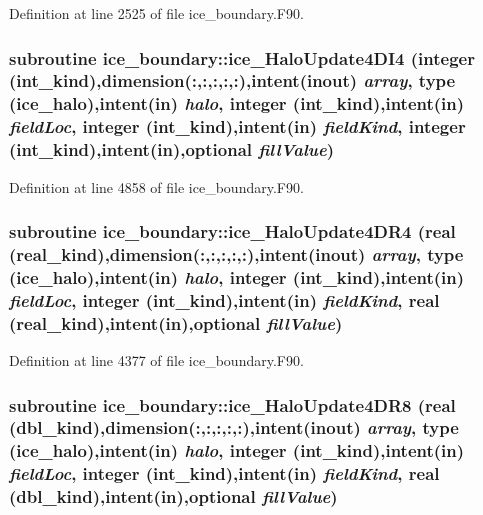 Definition at line 2525 of file ice\_\-boundary.F90.\hypertarget{namespaceice__boundary_aae151e9a894787fddeb6510b20919203}{
\subsubsection[{ice\_\-HaloUpdate4DI4}]{\setlength{\rightskip}{0pt plus 5cm}subroutine ice\_\-boundary::ice\_\-HaloUpdate4DI4 (integer (int\_\-kind),dimension(:,:,:,:,:),intent(inout) {\em array}, \/  type (ice\_\-halo),intent(in) {\em halo}, \/  integer (int\_\-kind),intent(in) {\em fieldLoc}, \/  integer (int\_\-kind),intent(in) {\em fieldKind}, \/  integer (int\_\-kind),intent(in),optional {\em fillValue})}}
\label{namespaceice__boundary_aae151e9a894787fddeb6510b20919203}


Definition at line 4858 of file ice\_\-boundary.F90.\hypertarget{namespaceice__boundary_a57e7b05282c54e5996798a87fa1a2e16}{
\subsubsection[{ice\_\-HaloUpdate4DR4}]{\setlength{\rightskip}{0pt plus 5cm}subroutine ice\_\-boundary::ice\_\-HaloUpdate4DR4 (real (real\_\-kind),dimension(:,:,:,:,:),intent(inout) {\em array}, \/  type (ice\_\-halo),intent(in) {\em halo}, \/  integer (int\_\-kind),intent(in) {\em fieldLoc}, \/  integer (int\_\-kind),intent(in) {\em fieldKind}, \/  real (real\_\-kind),intent(in),optional {\em fillValue})}}
\label{namespaceice__boundary_a57e7b05282c54e5996798a87fa1a2e16}


Definition at line 4377 of file ice\_\-boundary.F90.\hypertarget{namespaceice__boundary_adbf64712e93e11b0d0b099666f723af3}{
\subsubsection[{ice\_\-HaloUpdate4DR8}]{\setlength{\rightskip}{0pt plus 5cm}subroutine ice\_\-boundary::ice\_\-HaloUpdate4DR8 (real (dbl\_\-kind),dimension(:,:,:,:,:),intent(inout) {\em array}, \/  type (ice\_\-halo),intent(in) {\em halo}, \/  integer (int\_\-kind),intent(in) {\em fieldLoc}, \/  integer (int\_\-kind),intent(in) {\em fieldKind}, \/  real (dbl\_\-kind),intent(in),optional {\em fillValue})}}
\label{namespaceice__boundary_adbf64712e93e11b0d0b099666f723af3}


